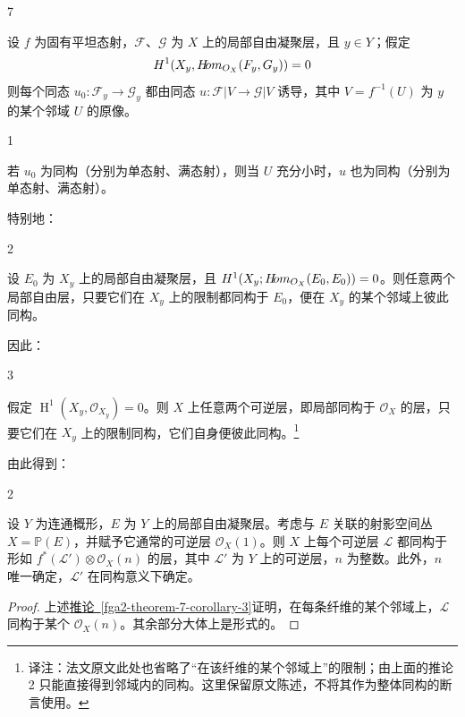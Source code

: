 \begin{theorem}{7}\label{fga2-theorem-7}\skipsinglepar
\par{}设 \(f\) 为固有平坦态射，\(\mathscr {F}\)、\(\mathscr {G}\) 为 \(X\) 上的局部自由凝聚层，且 \(y\in  Y\)；假定 \[\operatorname {H}^1(X_y,\mathscr {H}\kern  -2.5pt\mathit {om}_{\mathcal {O}_X}(\mathscr {F}_y,\mathscr {G}_y))=0\]则每个同态 \(u_0\colon \mathscr {F}_y\to \mathscr {G}_y\) 都由同态 \(u\colon \mathscr {F}|V\to \mathscr {G}|V\) 诱导，其中 \(V=f^{-1}(U)\) 为 \(y\) 的某个邻域 \(U\) 的原像。\end{theorem}
\begin{corollary}{1}\label{fga2-theorem-7-corollary-1}\skipsinglepar
\par{}若 \(u_0\) 为同构（分别为单态射、满态射），则当 \(U\) 充分小时，\(u\) 也为同构（分别为单态射、满态射）。\end{corollary}
\par{}特别地：
\begin{corollary}{2}\label{fga2-theorem-7-corollary-2}\skipsinglepar
\par{}设 \(E_0\) 为 \(X_y\) 上的局部自由凝聚层，且 \(\operatorname {H}^1(X_y;\mathscr {H}\kern  -2.5pt\mathit {om}_{\mathcal {O}_X}(E_0,E_0))=0\)。则任意两个局部自由层，只要它们在 \(X_y\) 上的限制都同构于 \(E_0\)，便在 \(X_y\) 的某个邻域上彼此同构。\end{corollary}
\par{}因此：
\begin{corollary}{3}\label{fga2-theorem-7-corollary-3}\skipsinglepar
\par{}假定 \(\operatorname {H}^1(X_y,\mathcal {O}_{X_y})=0\)。则 \(X\) 上任意两个可逆层，即局部同构于 \(\mathcal {O}_X\) 的层，只要它们在 \(X_y\) 上的限制同构，它们自身便彼此同构。\footnote{译注：法文原文此处也省略了“在该纤维的某个邻域上”的限制；由上面的推论 2 只能直接得到邻域内的同构。这里保留原文陈述，不将其作为整体同构的断言使用。}\end{corollary}
\par{}由此得到：
\begin{proposition}{2}\label{fga2-proposition-2}\skipsinglepar
\par{}设 \(Y\) 为连通概形，\(E\) 为 \(Y\) 上的局部自由凝聚层。考虑与 \(E\) 关联的射影空间丛 \(X=\mathbb {P}(E)\)，并赋予它通常的可逆层 \(\mathcal {O}_X(1)\)。则 \(X\) 上每个可逆层 \(\mathscr {L}\) 都同构于形如 \(f^*(\mathscr {L}')\otimes \mathcal {O}_X(n)\) 的层，其中 \(\mathscr {L}'\) 为 \(Y\) 上的可逆层，\(n\) 为整数。此外，\(n\) 唯一确定，\(\mathscr {L}'\) 在同构意义下确定。
\begin{proof}
\par{}上述\hyperref[fga2-theorem-7-corollary-3]{推论~\ref*{fga2-theorem-7-corollary-3}}证明，在每条纤维的某个邻域上，\(\mathscr {L}\) 同构于某个 \(\mathcal {O}_X(n)\)。其余部分大体上是形式的。\end{proof}\end{proposition}
